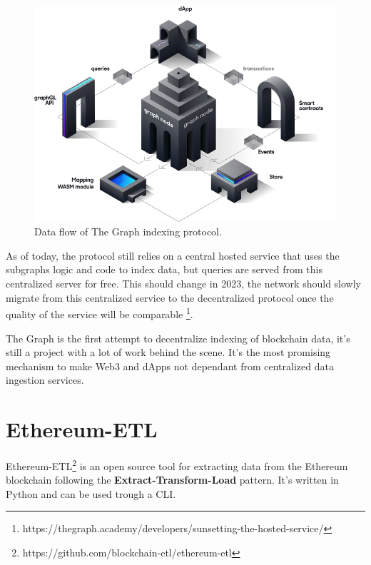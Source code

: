 \begin{figure}[H]
  \centering
  \includegraphics[width=1\textwidth]{Figures/graph-dataflow.png}
  \caption[The Graph data flow]{Data flow of The Graph indexing protocol\protect\footnotemark.}
  \label{fig:the-graph-data-flow}
\end{figure}



As of today, the protocol still relies on a central hosted service that uses the subgraphs logic and code to index data, but queries are served from this centralized server for free. This should change in 2023, the network should slowly migrate from this centralized service to the decentralized protocol once the quality of the service will be comparable \footnote{https://thegraph.academy/developers/sunsetting-the-hosted-service/}.

The Graph is the first attempt to decentralize indexing of blockchain data, it's still a project with a lot of work behind the scene. It's the most promising mechanism to make Web3 and dApps not dependant from centralized data ingestion services.


\section{Ethereum-ETL}

Ethereum-ETL\footnote{https://github.com/blockchain-etl/ethereum-etl} is an open source tool for extracting data from the Ethereum blockchain following the \textbf{Extract-Transform-Load} pattern. It's written in Python and can be used trough a CLI.

